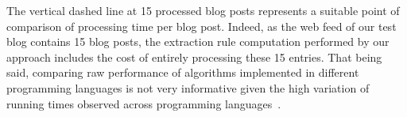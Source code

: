 The vertical dashed line at 15 processed blog posts represents a suitable point of comparison of processing time per blog post. Indeed, as the web feed of our test blog contains 15 blog posts, the extraction rule computation performed by our approach includes the cost of entirely processing these 15 entries. That being said, comparing raw performance of algorithms implemented in different programming languages is not very informative given the high variation of running times observed across programming languages~\cite{hundt2011}.
